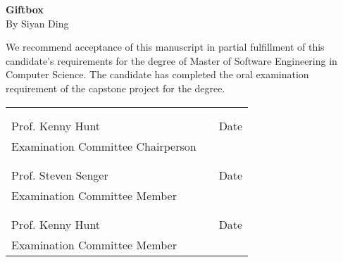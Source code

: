 \thispagestyle{empty}
\vspace*{0.3in}
\begin{center}
	\large{\textbf{Giftbox}} \\ 
	\vspace{0.75in}
	\normalsize{By Siyan Ding}
\end{center}

\vspace{0.5in}
\noindent We recommend acceptance of this manuscript in partial fulfillment of this candidate's requirements for the degree of Master of Software Engineering in Computer Science. The candidate has completed the oral examination requirement of the capstone project for the degree. \\

\noindent
\begin{tabularx}{\textwidth}{p{3in}Xp{2in}}
	\rule{0pt}{50pt} & & \\
	\hrulefill & & \hrulefill \\
	Prof. Kenny Hunt & & Date \\
	Examination Committee Chairperson & & \\
	\rule{0pt}{50pt} & & \\
	\hrulefill & & \hrulefill \\
	Prof. Steven Senger & & Date \\
	Examination Committee Member & & \\
	\rule{0pt}{50pt} & & \\
	\hrulefill & & \hrulefill \\
	Prof. Kenny Hunt & & Date \\
	Examination Committee Member & & \\
\end{tabularx}

